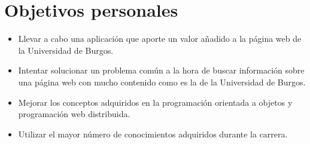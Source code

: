 \section{Objetivos personales}\label{objetivos-personales}

\begin{itemize}
\tightlist
\item
  Llevar a cabo una aplicación que aporte un valor añadido a la página web de la Universidad de Burgos.
\item
Intentar solucionar un problema común a la hora de buscar información sobre una página web con mucho contenido como es la de la Universidad de Burgos.
\item
Mejorar los conceptos adquiridos en la programación orientada a objetos y programación web distribuida.
\item
Utilizar el mayor número de conocimientos adquiridos durante la carrera.
\end{itemize}

